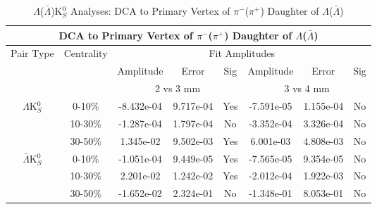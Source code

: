 \documentclass[../AnalysisNoteJBuxton.tex]{subfiles}
\begin{document}
\begin{table}
 \centering
 \begin{tabular}{|c|c|c|c|c||c|c|c|}
  \multicolumn{8}{c}{DCA to Primary Vertex of $\pi^{-}$($\pi^{+}$) Daughter of $\Lambda$($\bar{\Lambda}$)} \\
  \hline
  \multirow{3}{*}{Pair Type} & \multirow{3}{*}{Centrality} & \multicolumn{6}{c|}{Fit Amplitudes} \\
  \cline{3-8}
   & & Amplitude & Error & Sig & Amplitude & Error & Sig \\  
  \cline{3-8}
   & & \multicolumn{3}{c||}{2 vs 3 mm} & \multicolumn{3}{c|}{3 vs 4 mm} \\  
  \hline  
  \multirow{3}{*}{$\Lambda$K$^{0}_{S}$}  
   &  0-10\% & -8.432e-04 & 9.717e-04 & Yes & -7.591e-05 & 1.155e-04 & No \\
   & 10-30\% & -1.287e-04 & 1.797e-04 & No & -3.352e-04 & 3.326e-04 & No \\
   & 30-50\% & 1.345e-02 & 9.502e-03 & Yes & 6.001e-03 & 4.808e-03 & No \\
  \hline  
  \multirow{3}{*}{$\bar{\Lambda}$K$^{0}_{S}$}  
   &  0-10\% & -1.051e-04 & 9.449e-05 & Yes & -7.565e-05 & 9.354e-05 & No \\
   & 10-30\% & 2.201e-02 & 1.242e-02 & Yes & -2.012e-04 & 1.922e-03 & No \\
   & 30-50\% & -1.652e-02 & 2.324e-01 & No & -1.348e-01 & 8.053e-01 & No \\
  \hline
 \end{tabular}
 \caption{$\Lambda$($\bar{\Lambda}$)K$^{0}_{S}$ Analyses: DCA to Primary Vertex of $\pi^{-}$($\pi^{+}$) Daughter of $\Lambda$($\bar{\Lambda}$)}
 \label{tab:DcaToPrimVertexPionDaughtOfLamLamK0}
\end{table}
\end{document}
